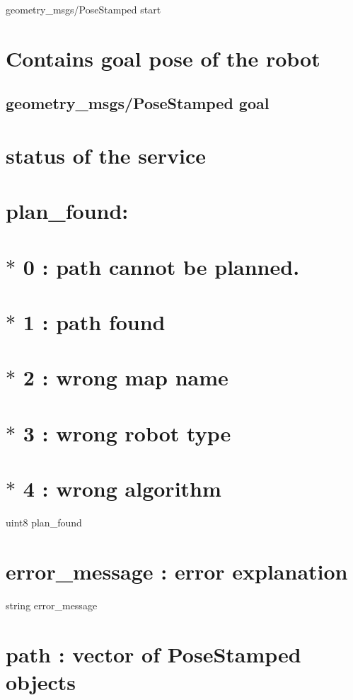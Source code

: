 geometry\-\_\-msgs/\-Pose\-Stamped start \section*{Contains goal pose of the robot}

\subsection*{geometry\-\_\-msgs/\-Pose\-Stamped goal }

\section*{status of the service}

\section*{plan\-\_\-found\-:}

\section*{$\ast$ 0 \-: path cannot be planned.}

\section*{$\ast$ 1 \-: path found}

\section*{$\ast$ 2 \-: wrong map name}

\section*{$\ast$ 3 \-: wrong robot type}

\section*{$\ast$ 4 \-: wrong algorithm}

uint8 plan\-\_\-found \section*{error\-\_\-message \-: error explanation}

string error\-\_\-message \section*{path \-: vector of Pose\-Stamped objects}

